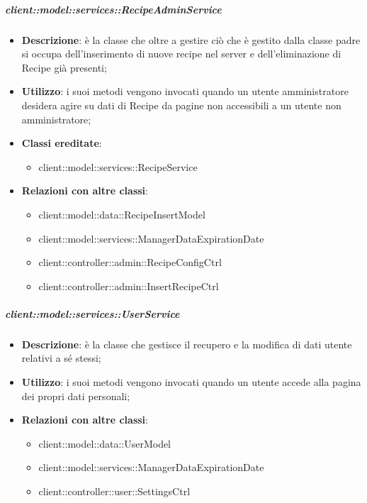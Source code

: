 		\subparagraph{client::model::services::RecipeAdminService} %
		\label{subp:client_model_services_recipeadminservice}
			\begin{itemize}
				\item \textbf{Descrizione}: è la classe che oltre a gestire ciò che è gestito dalla classe padre si occupa dell'inserimento di nuove recipe nel server e dell'eliminazione di Recipe già presenti;
				\item \textbf{Utilizzo}: i suoi metodi vengono invocati quando un utente amministratore desidera agire su dati di Recipe da pagine non accessibili a un utente non amministratore;
				\item \textbf{Classi ereditate}:
					\begin{itemize}
						\item client::model::services::RecipeService
					\end{itemize}
				\item \textbf{Relazioni con altre classi}:
					\begin{itemize}
						\item client::model::data::RecipeInsertModel
						\item client::model::services::ManagerDataExpirationDate
						\item client::controller::admin::RecipeConfigCtrl
						\item client::controller::admin::InsertRecipeCtrl
					\end{itemize}
			\end{itemize}


		\subparagraph{client::model::services::UserService} %
		\label{subp:client_model_services_userservice}
			\begin{itemize}
				\item \textbf{Descrizione}: è la classe che gestisce il recupero e la modifica di dati utente relativi a sé stessi;
				\item \textbf{Utilizzo}: i suoi metodi vengono invocati quando un utente accede alla pagina dei propri dati personali;
				\item \textbf{Relazioni con altre classi}:
					\begin{itemize}
						\item client::model::data::UserModel
						\item client::model::services::ManagerDataExpirationDate
						\item client::controller::user::SettingsCtrl
					\end{itemize}
			\end{itemize}

